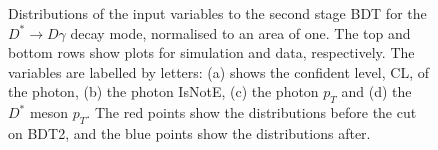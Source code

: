 \documentclass[oneside,12pt]{article}
\begin{document}
\begin{figure}[H]
  \caption{{Distributions of the input variables to the second stage BDT for
      the $D^* \rightarrow D\gamma$ decay mode, normalised to an area of one. The top
      and bottom rows show plots for simulation and data, respectively. The variables
      are labelled by letters: (a) shows the confident level, CL, of the photon, (b)
      the photon IsNotE, (c) the photon $p_T$ and (d) the $D^*$ meson $p_T$. The red
      points show the distributions before the cut on BDT2, and the blue points show
  the distributions after.}} \label{fig:GammaBDT2Variables}
\end{figure}
\end{document}

